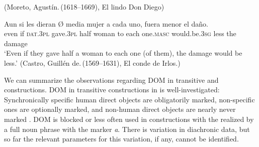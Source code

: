\documentclass[output=paper]{LSP/langsci}
\begin{document}
(Moreto, Agustín.\,(1618–1669), El lindo Don Diego)
\z 
\ea
\label{11-he-ex:10}

\gll Aun si les dieran Ø media mujer a cada uno, fuera menor el daño.\\
even if \textsc{dat.3pl} gave.\textsc{3pl} {} half woman to each one.\textsc{masc} would.be.\textsc{3sg} less the damage\\
\glt ‘Even if they gave half a woman to each one (of them), the damage would be less.’ (Castro, Guillén de.\,(1569–1631), El conde de Irlos.)
\z

We can summarize the observations regarding DOM in transitive and  constructions. DOM in transitive constructions in  is well-investigated: Synchronically specific  human direct objects are obligatorily marked, non-specific ones are optionally marked, and non-human direct objects are nearly never marked \citep{Brugeetal1996Accusative,Leonetti2004Specificity, vonHeusingeretal2007Differential,GarciaGarcia2014Objektmarkierung}. DOM is blocked or less often used in  constructions with the  realized by a full noun phrase with the  marker \textit{a}. There is variation in diachronic data, but so far the relevant parameters for this variation, if any, cannot be identified. 
\end{document}
